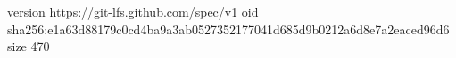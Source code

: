 version https://git-lfs.github.com/spec/v1
oid sha256:e1a63d88179c0cd4ba9a3ab0527352177041d685d9b0212a6d8e7a2eaced96d6
size 470

